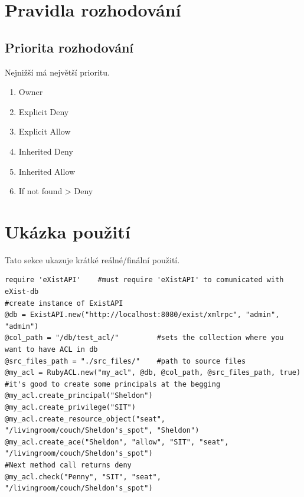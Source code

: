 \documentclass[11pt,twoside,a4paper]{book}
\begin{document}
\section{Pravidla rozhodování}
\subsection{Priorita rozhodování}

Nejnižší má největší prioritu.

\begin{enumerate}
\item Owner
\item Explicit Deny
\item Explicit Allow
\item Inherited Deny
\item Inherited Allow
\item If not found > Deny
\end{enumerate}

\section{Ukázka použití}
Tato sekce ukazuje krátké reálné/finální použití.
\begin{verbatim}
require 'eXistAPI'    #must require 'eXistAPI' to comunicated with eXist-db
#create instance of ExistAPI
@db = ExistAPI.new("http://localhost:8080/exist/xmlrpc", "admin", "admin")    
@col_path = "/db/test_acl/"         #sets the collection where you want to have ACL in db
@src_files_path = "./src_files/"    #path to source files
@my_acl = RubyACL.new("my_acl", @db, @col_path, @src_files_path, true)
#it's good to create some principals at the begging
@my_acl.create_principal("Sheldon")
@my_acl.create_privilege("SIT")
@my_acl.create_resource_object("seat", "/livingroom/couch/Sheldon's_spot", "Sheldon")
@my_acl.create_ace("Sheldon", "allow", "SIT", "seat", "/livingroom/couch/Sheldon's_spot")
#Next method call returns deny
@my_acl.check("Penny", "SIT", "seat", "/livingroom/couch/Sheldon's_spot")
\end{verbatim}

\end{document}

